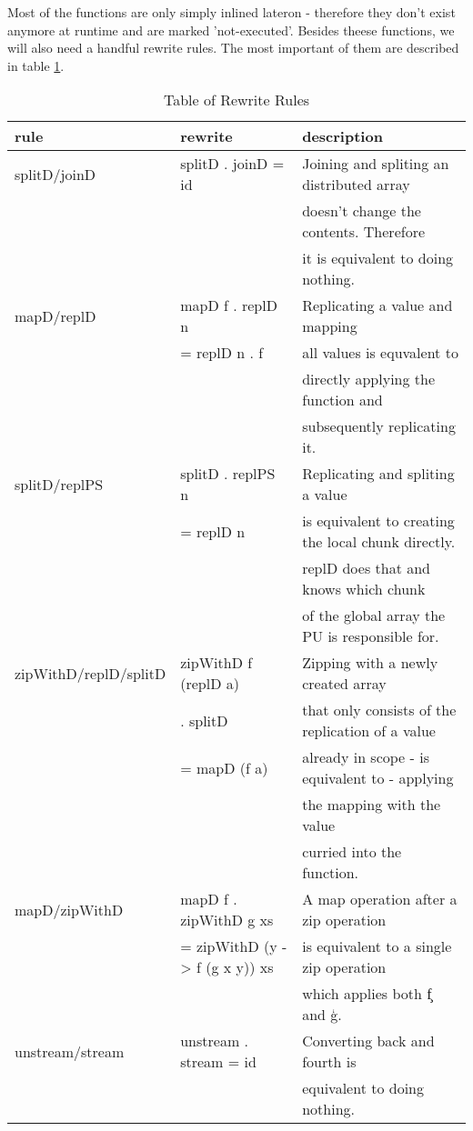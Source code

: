     Most of the functions are only simply inlined lateron - therefore they don't exist anymore at runtime and
    are marked 'not-executed'. Besides theese functions, we will also need a handful rewrite rules.
    The most important of them are described in table \ref{rules}.
    
    \begin{table}[h]
      \caption{Table of Rewrite Rules}
      \label{rules}
      \begin{tabular}{lll}
          \toprule
          rule & rewrite & description \\
          \midrule
          splitD/joinD & splitD . joinD = id & Joining and spliting an distributed array  \\
          & & doesn't change the contents. Therefore \\
          & & it is equivalent to doing nothing. \\
          
          mapD/replD & mapD f . replD n & Replicating a value and mapping \\
          & = replD n . f & all values is equvalent to \\
          & & directly applying the function and \\
          & & subsequently replicating it. \\
          
          splitD/replPS & splitD . replPS n & Replicating and spliting a value \\
          & = replD n & is equivalent to creating the local chunk directly. \\
          & & replD does that and knows which chunk \\
          & & of the global array the PU is responsible for. \\
          
          zipWithD/replD/splitD & zipWithD f (replD a) & Zipping with a newly created array \\
          &  . splitD  & that only consists of the replication of a value \\
          & = mapD (f a)& already in scope - is equivalent to - applying \\
          & & the mapping with the value \\
          & & curried into the function.\\
          
          mapD/zipWithD & mapD f . zipWithD g xs & A map operation after a zip operation \\
          & = zipWithD (\x y -> f (g x y)) xs & is equivalent to a single zip operation \\
          & & which applies both \c{f} and \c{g}. \\
          
          unstream/stream & unstream . stream = id & Converting back and fourth is \\
          &  & equivalent to doing nothing. \\
       \end{tabular}
    \end{table}
  
